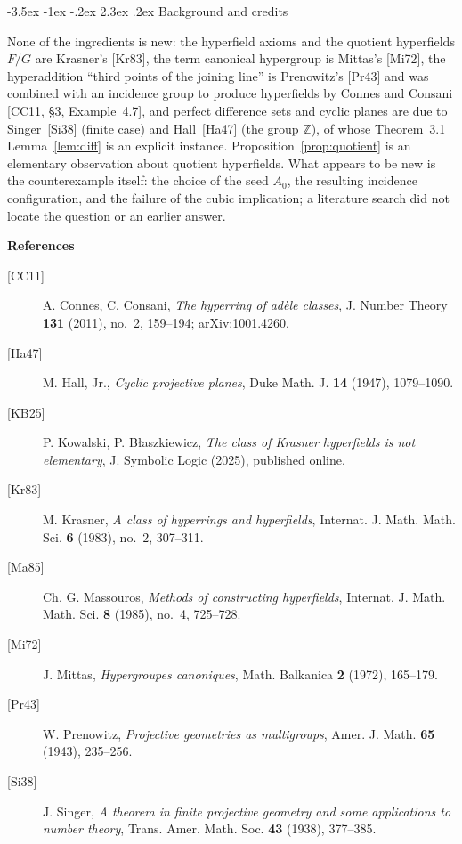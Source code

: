 \documentclass[11pt]{article}
\makeatletter
\renewcommand\section{\@startsection{section}{1}{\z@}
  {-3.5ex \@plus -1ex \@minus -.2ex}
  {2.3ex \@plus.2ex}
  {\normalfont\bfseries}}
\theoremstyle{plain}
\theoremstyle{definition}
\newcommand{\Z}{\mathbb{Z}}
\makeatother
\begin{document}
\section{Background and credits}\label{sec:credits}

None of the ingredients is new: the hyperfield axioms and the quotient
hyperfields $F/G$ are Krasner's [Kr83], the term canonical hypergroup
is Mittas's [Mi72], the hyperaddition ``third points of the joining
line'' is Prenowitz's [Pr43] and was combined with an incidence group
to produce hyperfields by Connes and Consani [CC11, \S3, Example~4.7],
and perfect difference sets and cyclic planes are due to Singer~[Si38]
(finite case) and Hall~[Ha47] (the group $\Z$), of whose Theorem~3.1
Lemma~\ref{lem:diff} is an explicit instance.
Proposition~\ref{prop:quotient} is an elementary observation about
quotient hyperfields.  What appears to be new is the counterexample
itself: the choice of the seed $A_0$, the resulting incidence
configuration, and the failure of the cubic implication; a literature
search did not locate the question or an earlier answer.

\medskip
\noindent\textbf{References}

\begin{description}
\item[{[CC11]}] A. Connes, C. Consani,
\emph{The hyperring of ad\`ele classes},
J. Number Theory \textbf{131} (2011), no.~2, 159--194; arXiv:1001.4260.
\item[{[Ha47]}] M. Hall, Jr.,
\emph{Cyclic projective planes},
Duke Math. J. \textbf{14} (1947), 1079--1090.
\item[{[KB25]}] P. Kowalski, P. B\l{}aszkiewicz,
\emph{The class of Krasner hyperfields is not elementary},
J. Symbolic Logic (2025), published online.
\item[{[Kr83]}] M. Krasner,
\emph{A class of hyperrings and hyperfields},
Internat. J. Math. Math. Sci. \textbf{6} (1983), no.~2, 307--311.
\item[{[Ma85]}] Ch. G. Massouros,
\emph{Methods of constructing hyperfields},
Internat. J. Math. Math. Sci. \textbf{8} (1985), no.~4, 725--728.
\item[{[Mi72]}] J. Mittas,
\emph{Hypergroupes canoniques},
Math. Balkanica \textbf{2} (1972), 165--179.
\item[{[Pr43]}] W. Prenowitz,
\emph{Projective geometries as multigroups},
Amer. J. Math. \textbf{65} (1943), 235--256.
\item[{[Si38]}] J. Singer,
\emph{A theorem in finite projective geometry and some applications to
number theory},
Trans. Amer. Math. Soc. \textbf{43} (1938), 377--385.
\end{description}
\end{document}
